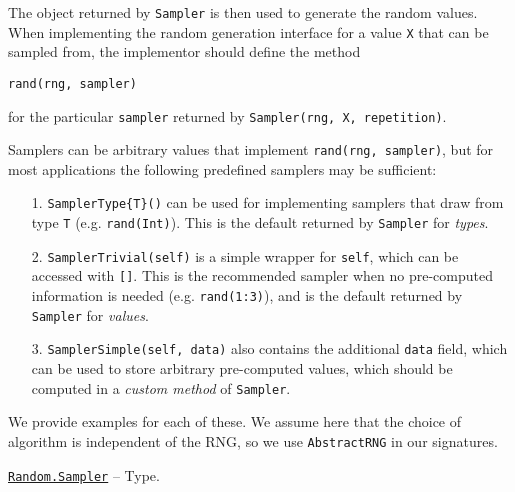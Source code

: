 The object returned by \texttt{Sampler} is then used to generate the random values. When implementing the random generation interface for a value \texttt{X} that can be sampled from, the implementor should define the method




\begin{verbatim}
rand(rng, sampler)
\end{verbatim}



for the particular \texttt{sampler} returned by \texttt{Sampler(rng, X, repetition)}.



Samplers can be arbitrary values that implement \texttt{rand(rng, sampler)}, but for most applications the following predefined samplers may be sufficient:



\begin{itemize}
\item[1. ] \texttt{SamplerType\{T\}()} can be used for implementing samplers that draw from type \texttt{T} (e.g. \texttt{rand(Int)}). This is the default returned by \texttt{Sampler} for \emph{types}.


\item[2. ] \texttt{SamplerTrivial(self)} is a simple wrapper for \texttt{self}, which can be accessed with \texttt{[]}. This is the recommended sampler when no pre-computed information is needed (e.g. \texttt{rand(1:3)}), and is the default returned by \texttt{Sampler} for \emph{values}.


\item[3. ] \texttt{SamplerSimple(self, data)} also contains the additional \texttt{data} field, which can be used to store arbitrary pre-computed values, which should be computed in a \emph{custom method} of \texttt{Sampler}.

\end{itemize}


We provide examples for each of these. We assume here that the choice of algorithm is independent of the RNG, so we use \texttt{AbstractRNG} in our signatures.


\hypertarget{6931553397315604036}{} 
\hyperlink{6931553397315604036}{\texttt{Random.Sampler}}  -- {Type.}

